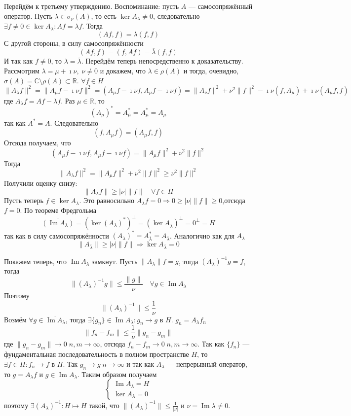 \documentclass[12pt]{article}
\renewcommand{\Im}{\operatorname{Im}}
\newcommand{\Al}{A_\lambda}
\newcommand{\Alo}{(\Al)^{-1}}
\begin{document}
\begin{Proof}
    Перейдём к третьему утверждению.
    Воспоминание: пусть $A$ --- самосопряжённый оператор.
    Пусть $\lambda \in \sigma_p(A)$, то есть $\ker \Al \ne 0$, следовательно
    $\exists f \ne 0 \in \ker \Al\colon Af = \lambda f$.
    Тогда 
    $$
    (Af, f) = \lambda (f, f)
    $$
    С другой стороны, в силу самосопряжённости
    $$
    (Af, f) = (f, Af) = \overline{\lambda}(f, f)
    $$
    И так как $f \ne 0$, то $\lambda = \overline{\lambda}$.
    Перейдём теперь непосредственно к доказательству.
    Рассмотрим $\lambda = \mu + \imath \nu,\; \nu \ne 0$ и докажем, что
    $\lambda \in \rho(A)$ и тогда, очевидно, $\sigma(A)
    = \mathbb C \setminus \rho(A) \subset \mathbb R$.
    $\forall f \in H$
    $$
    \|A_\lambda f\|^2 = \|A_\mu f - \imath \nu f\|^2 = (A_\mu f - \imath \nu
    f, A_\mu f - \imath \nu f) = \|A_\nu f\|^2 + 
    \nu^2 \|f\|^2 - \imath \nu (f, A_\mu) + \imath \nu (A_\mu f, f)
    $$
    где $A_\lambda f = Af - \lambda f$.
    Раз $\mu \in \mathbb R$, то 
    $$
    (A_\mu)^* = A^*_{\overline{\mu}} = A^*_\mu = A_\mu
    $$
    так как $A^* = A$.
    Следовательно
    $$
    (f, A_\mu f) = (A_\mu f, f)
    $$
    Отсюда получаем, что
    $$
    (A_\mu f - \imath \nu f, A_\mu f - \imath \nu f) = \|A_\mu f\|^2 + \nu^2
    \|f\|^2
    $$
    Тогда
    $$
    \|A_\lambda f\|^2 = \|A_\mu f\|^2 + \nu^2\|f\|^2 \ge \nu^2 \|f\|^2
    $$
    Получили оценку снизу:
    $$
    \|A_\lambda f\| \ge |\nu| \|f\| \quad \forall f \in H
    $$
    Пусть теперь $f \in \ker A_\lambda$.
    Это равносильно $A_\lambda f = 0 \Rightarrow 0 \ge |\nu|\|f\| \ge
    0$,отсюда $f = 0$.
    По теореме Фредгольма 
    $$
    \overline{(\Im A_\lambda)} = (\ker(A_\lambda)^*)^\perp = (\ker
    A_{\overline
    {\lambda}})^\perp = 0^\perp = H
    $$
    так как в силу самосопряжённости $(A_\lambda)^* = A^*_{\overline{\lambda}} 
    = A_{\overline{\lambda}}$.
    Аналогично как для $A_\lambda$
    $$
    \|A_{\overline{\lambda}}\| \ge |\nu| \|f\| \Rightarrow \ker
    A_{\overline{\lambda}} = 0
    $$
    
    Покажем теперь, что $\Im A_\lambda$ замкнут.
    Пусть $\|A_\lambda\|f = g$, тогда $\Alo g =f$, тогда
    $$
    \|\Alo g\| \le \frac{\|g\|}{\nu} \quad \forall g \in \Im \Al
    $$
    Поэтому
    $$
    \|\Alo\| \le \frac{1}{\nu}
    $$
    Возмём $\forall g \in \overline{\Im \Al}$, тогда $\exists \{g_n\} \in \Im
    \Al\colon g_n \to g$ в $H$.
    $g_n = \Al f_n$
    $$
    \|f_n - f_m\| \le \frac{1}{\nu}\|g_n - g_m\|
    $$
    где $\|g_n - g_m\| \to 0\; n,m \to \infty$, отсюда $f_n - f_m \to 0\; n,m 
    \to \infty$.
    Так как $\{f_n\}$ --- фундаментальная последовательность в полном 
    пространстве $H$, то $\exists f \in H\colon f_n \to f$ 
    в $H$.
    Так $g_n \to g\; n \to \infty$ и так как $\Al$ --- непрерывный оператор, 
    то $g = \Al f$ и $g \in \Im \Al$.
    Таким образом получаем
    $$
    \left\{
        \begin{aligned}
            \Im \Al = H\\
            \ker \Al = 0
        \end{aligned}
   \right.
   $$
   поэтому $\exists \Alo : H \mapsto H$ такой, что $\|\Alo\| \le \frac{1}{|
   \nu|}$ и $\nu = \Im \lambda \ne 0$.
\end{Proof}
\end{document}
